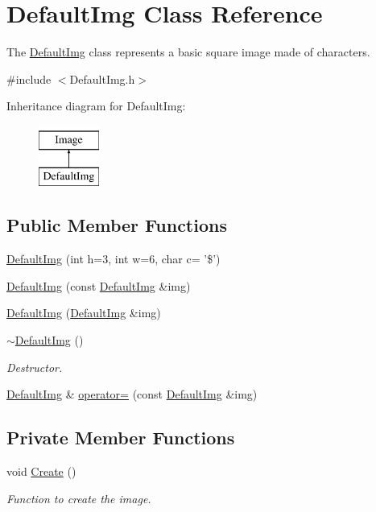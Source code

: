 \hypertarget{classDefaultImg}{\section{Default\-Img Class Reference}
\label{classDefaultImg}
}


The \hyperlink{classDefaultImg}{Default\-Img} class represents a basic square image made of characters.  




{\ttfamily \#include $<$Default\-Img.\-h$>$}

Inheritance diagram for Default\-Img\-:\begin{figure}[H]
\begin{center}
\leavevmode
\includegraphics[height=2.000000cm]{classDefaultImg}
\end{center}
\end{figure}
\subsection*{Public Member Functions}
\begin{DoxyCompactItemize}
\item 
\hyperlink{classDefaultImg_a31bb4b35474265b11ea7a776343148bc}{Default\-Img} (int h=3, int w=6, char c= '\$')
\item 
\hyperlink{classDefaultImg_a98d6ecfaa4c02eba7b2c58ad0285521e}{Default\-Img} (const \hyperlink{classDefaultImg}{Default\-Img} \&img)
\item 
\hyperlink{classDefaultImg_ad4763b2a674e202d3ea99ceb179bad6a}{Default\-Img} (\hyperlink{classDefaultImg}{Default\-Img} \&img)
\item 
\hyperlink{classDefaultImg_ad3b823ee6222b08a4999802a0dc5ceec}{$\sim$\-Default\-Img} ()
\begin{DoxyCompactList}\small\item\em Destructor. \end{DoxyCompactList}\item 
\hyperlink{classDefaultImg}{Default\-Img} \& \hyperlink{classDefaultImg_a953dc476a8f2683801ece30ec159617f}{operator=} (const \hyperlink{classDefaultImg}{Default\-Img} \&img)
\end{DoxyCompactItemize}
\subsection*{Private Member Functions}
\begin{DoxyCompactItemize}
\item 
void \hyperlink{classDefaultImg_a9ab21b397e0d23831b2944b651058b89}{Create} ()
\begin{DoxyCompactList}\small\item\em Function to create the image. \end{DoxyCompactList}\end{DoxyCompactItemize}
